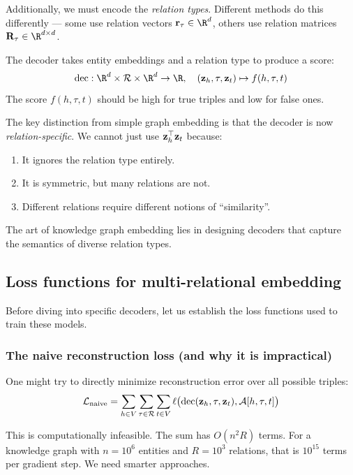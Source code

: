 \begin{notechapter}
\begin{definition}
Additionally, we must encode the \emph{relation types}. Different methods do this differently --- some use relation vectors $\vect{r}_\tau \in \R^d$, others use relation matrices $\vect{R}_\tau \in \R^{d \times d}$.
\end{definition}

\begin{definition}
The decoder takes entity embeddings and a relation type to produce a score:
\[
\text{dec}: \R^d \times \mathcal{R} \times \R^d \to \R, \quad (\vect{z}_h, \tau, \vect{z}_t) \mapsto f(h, \tau, t)
\]
The score $f(h, \tau, t)$ should be high for true triples and low for false ones.
\end{definition}

\begin{keyidea}
The key distinction from simple graph embedding is that the decoder is now \emph{relation-specific}. We cannot just use $\mathbf{z}_h^\top \mathbf{z}_t$ because:
\begin{enumerate}
    \item It ignores the relation type entirely.
    \item It is symmetric, but many relations are not.
    \item Different relations require different notions of ``similarity''.
\end{enumerate}
The art of knowledge graph embedding lies in designing decoders that capture the semantics of diverse relation types.
\end{keyidea}

\subsection{Loss functions for multi-relational embedding}

Before diving into specific decoders, let us establish the loss functions used to train these models.

\subsubsection*{The naive reconstruction loss (and why it is impractical)}

One might try to directly minimize reconstruction error over all possible triples:
\[
\mathcal{L}_{\text{naive}} = \sum_{h \in V} \sum_{\tau \in \mathcal{R}} \sum_{t \in V} \ell\bigl(\text{dec}(\mathbf{z}_h, \tau, \mathbf{z}_t), \mathcal{A}[h, \tau, t]\bigr)
\]

\begin{intuition}[Motivation]
This is computationally infeasible. The sum has $O(n^2 R)$ terms. For a knowledge graph with $n = 10^6$ entities and $R = 10^3$ relations, that is $10^{15}$ terms per gradient step. We need smarter approaches.
\end{intuition}


\end{notechapter}

